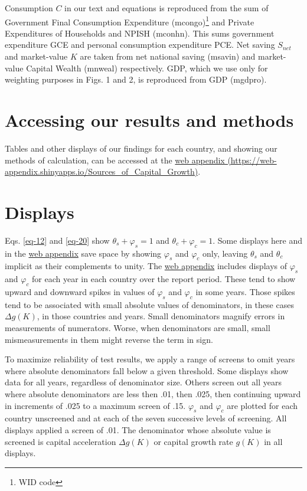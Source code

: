 \documentclass[a4paper,fleqn]{latex_styles/cas-sc}
\begin{document}
Consumption $C$ in our text and equations is reproduced from the sum of Government Final Consumption Expenditure (mcongo)\footnote{\label{widnote}WID code} and Private Expenditures of Households and NPISH (mconhn). This sums government expenditure GCE and personal consumption expenditure PCE. Net saving $S_{net}$ and market-value $K$ are taken from net national saving (msavin) and market-value Capital Wealth (mnweal) respectively. GDP, which we use only for weighting purposes in Figs. 1 and 2, is reproduced from GDP (mgdpro).

\hypertarget{accessing-our-results-and-methods}{%
\section{Accessing our results and
methods}\label{accessing-our-results-and-methods}}

Tables and other displays of our findings for each country, and showing
our methods of calculation, can be accessed at the
\href{https://web-appendix.shinyapps.io/Sources\_of\_Capital\_Growth/}{web appendix (https://web-appendix.shinyapps.io/Sources\_of\_Capital\_Growth)}.

\hypertarget{sec-displays}{%
\section{Displays}\label{sec-displays}}

Eqs. \eqref{eq-12} and \eqref{eq-20} show
\(\theta_s + \varphi_s = 1\) and \(\theta_c + \varphi_c = 1\). Some
displays here and in the
\href{https://web-appendix.shinyapps.io/Sources\_of\_Capital\_Growth/}{web appendix}
save space by showing \(\varphi_s\) and \(\varphi_c\) only, leaving
\(\theta_s\) and \(\theta_c\) implicit as their complements to unity.
The \href{https://web-appendix.shinyapps.io/Sources\_of\_Capital\_Growth/}{web
appendix} includes displays of \(\varphi_s\) and \(\varphi_c\) for
each year in each country over the report period. These tend to show
upward and downward spikes in values of \(\varphi_s\) and \(\varphi_c\)
in some years. Those spikes tend to be associated with small absolute
values of denominators, in these cases \(\Delta g(K)\), in those
countries and years. Small denominators magnify errors in measurements
of numerators. Worse, when denominators are small, small mismeasurements in them might reverse the term in sign.

To maximize reliability of test results, we apply a range of screens to
omit years where absolute denominators fall below a given
threshold. Some displays show data for all years, regardless of denominator size.
Others screen out all years where
absolute denominators are less then .01, then .025, then continuing upward in
increments of .025 to a maximum screen of .15. \(\varphi_s\) and
\(\varphi_c\) are plotted for each country unscreened and at each of the
seven successive levels of screening. All displays applied a screen of .01. 
The denominator whose absolute value is screened is capital acceleration
$\Delta g(K)$ or capital growth rate \(g(K)\) in all displays. 
\end{document}
